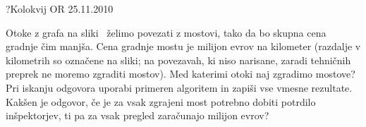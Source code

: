 \begin{naloga}{?}{Kolokvij OR 25.11.2010}
\begin{vprasanje}
Otoke z grafa na sliki~\fig{} želimo povezati z mostovi,
tako da bo skupna cena grad\-nje čim manjša.
Cena gradnje mostu je milijon evrov na kilometer
(razdalje v kilometrih so označene na sliki;
na povezavah, ki niso narisane,
zaradi tehničnih preprek ne moremo zgraditi mostov).
Med katerimi otoki naj zgradimo mostove?
Pri iskanju odgovora uporabi primeren algoritem
in zapiši vse vmesne rezultate.
Kakšen je odgovor,
če je za vsak zgrajeni most potrebno dobiti potrdilo inšpektorjev,
ti pa za vsak pregled zaračunajo milijon evrov?

\begin{slika}
\pgfslika
{}
\end{slika}
\end{vprasanje}
\begin{odgovor}
\end{odgovor}
\end{naloga}

